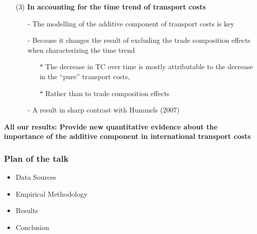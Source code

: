 \documentclass[10 pt,Helvetica, french]{beamer}
\begin{document}
\begin{frame}
\begin{itemize}
\item[(3)] \textbf{In accounting for the time trend of transport costs} \vspace{0.2cm}
\begin{itemize}
\item[-] The modelling of the additive component of transport costs is key \vspace{0.1cm}
\item[-] Because it changes the result of excluding the trade composition effects when characterizing the time trend \vspace{0.1cm}
\begin{itemize}
\item[$\ast$] The decrease in TC over time is mostly attributable to the decrease in the ``pure'' transport costs,  \vspace{0.1cm}
\item[$\ast$] Rather than to trade composition effects  \vspace{0.1cm}
\end{itemize}
\item[-] A result in sharp contrast with Hummels (2007) \vspace{0.2cm}
\end{itemize}
\end{itemize}
\textbf{All our results: Provide new quantitative evidence about the importance of the additive component in international transport costs}

\end{frame}


\begin{frame}
\frametitle{Plan of the talk}
\begin{itemize}
\item Data Sources  \vspace{0.2cm}
\item Empirical Methodology \vspace{0.2cm}
\item Results \vspace{0.2cm}
\item Conclusion
\end{itemize}
\end{frame}
\end{document}

